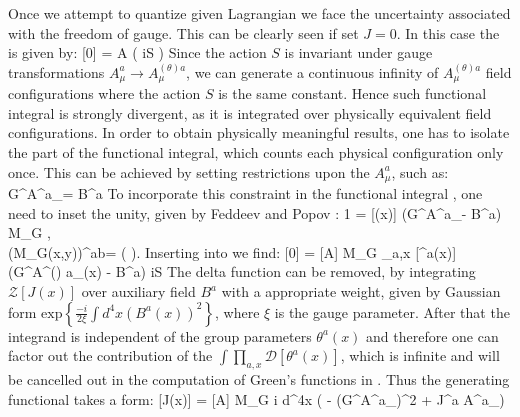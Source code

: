 Once we attempt to quantize given Lagrangian \Eq{\ref{qcd_low:Gen_functional_vec}} we face the uncertainty associated with the freedom of gauge. This can be clearly seen if set $J=0$. In this case the \Eq{\ref{qcd_low:Gen_functional_vec}} is given by:
	\beqa
		\label{qcd_low:Gen_functional_vec_0}
		[0] = \int {} A\; ( iS )
	\eeqa	
Since the action $S$ is invariant under gauge transformations $A^a_\mu \rightarrow A^{(\theta)a}_\mu$, we can generate a continuous infinity of $A^{(\theta)a}_\mu$ field configurations where the action $S$ is the same constant. Hence such functional integral is strongly divergent, as it is integrated over physically equivalent field configurations. In order to obtain physically meaningful results, one has to isolate the part of the functional integral, which counts each physical configuration only once. This can be achieved by setting restrictions upon the $A^a_\mu$, such as:
	\beqa
		\label{qcd_low:gauge_fix}
		G^\mu A^a_\mu = B^a
	\eeqa
To incorporate this constraint \Eq{\ref{qcd_low:gauge_fix}} in the functional integral \Eq{\ref{qcd_low:Gen_functional_vec_0}}, one need to inset the unity, given by Feddeev and Popov \cite{Faddeev196729}:
	\beqa
		\label{qcd_low:FP_unity}
		1 = \int {}[\theta(x)] \delta(G^\mu A^a_\mu - B^a) \;  M_G \;, \\ 
		\notag {} \;\;\; (M_G(x,y))^{ab}= \left(  \right)\;.
	\eeqa
Inserting \Eq{\ref{qcd_low:FP_unity}} into \Eq{\ref{qcd_low:Gen_functional_vec_0}} we find:
	\beqa
		\label{qcd_low:Gen_functional_vec_1}
		[0] = \int {} [A] \;  M_G \int \prod_{a,x} [\theta^a(x)] \delta(G^\mu A^{(\theta) a}_\mu(x) - B^a)  \;  \left\lbrace iS\right\rbrace 
	\eeqa
The delta function can be removed, by integrating $\mathcal{Z}[J(x)]$ over auxiliary field $B^a$ with a appropriate weight, given by Gaussian form $\text{exp} \left\lbrace  \frac{-i}{2\xi}\int d^4x (B^a(x))^2 \right\rbrace $, where $\xi$ is the gauge parameter. After that the integrand is independent of the group parameters $\theta^a(x)$ and therefore one can factor out the contribution of the $\int \prod_{a,x} \mathcal{D}[\theta^a(x)]$, which is infinite and will be cancelled out in the computation of Green's functions in \Eq{\ref{qcd_low:Green_func}}. Thus the generating functional takes a form:
	\beqa
		\label{qcd_low:Gen_functional_vec_2}
		 = \int {} [A] \;  M_G \;   \left\lbrace i \int d^4x \left(  - (G^\mu A^a_\mu)^2 + J^{a\mu} A^a_\mu \right)  \right\rbrace \;\;
